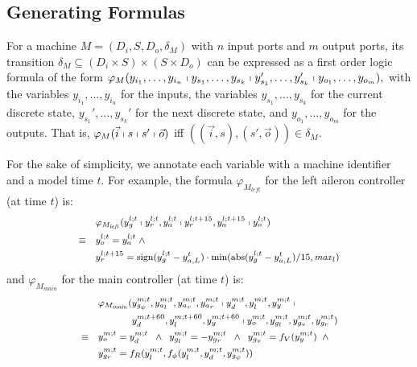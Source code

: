 \documentclass{sig-alternate}
\newcommand{\abs}{\ensuremath{\mathrm{abs}}}
\newcommand{\sign}{\ensuremath{\mathrm{sign}}}
\begin{document}
 


\subsection{Generating Formulas}

For a machine  $M = (D_i,S,D_o,\delta_M)$
with $n$ input ports and $m$ output ports,
its transition $\delta_M \subseteq (D_i \times S) \times (S \times D_o)$
can be expressed as a first order logic formula of the form
$\varphi_{M}(y_{i_1},\ldots,y_{i_n}\shortmid
y_{s_1},\ldots,y_{s_k}\shortmid
y_{s_1}',\ldots,y_{s_k}'\shortmid
y_{o_1},\ldots,y_{o_m}),
$ with
the variables $y_{i_1},\ldots,y_{i_n}$ for the inputs,
the variables $y_{s_1},\ldots,y_{s_k}$  for the current discrete state, 
$y_{s_1}',\ldots,y_{s_k}'$  for the next discrete state, and 
$y_{o_1},\ldots,y_{o_m}$  for the outputs.
That is,
$\varphi_{M}(\vec{i}\shortmid s\shortmid s'\shortmid  \vec{o})$
iff $( (\vec{i}, s), (s', \vec{o}) ) \in \delta_{M}$.

For the sake of simplicity, 
we annotate each variable with 
a machine identifier and a model time $t$. %
For example, the formula $\varphi_{M_\mathit{left}}$
for the left aileron controller (at time $t$) is:
\[
\begin{medsize}
\begin{aligned}
&
\varphi_{M_\mathit{left}}(y_{g}^{l;t} \shortmid  y_{r}^{l;t}, y_{a}^{l;t} 
	\shortmid y_{r}^{l;t + 15}, y_{a}^{l;t + 15} \shortmid y_{o}^{l;t})
\\
\equiv\quad
&
y_{o}^{l;t} = y_{a}^{l;t} \;\wedge
\\
&
y_{r}^{l;t + 15} = \sign(y_{g}^{l;t} - y_{a,L}^{t}) \cdot \min(\abs(y_{g}^{l;t} - y_{a,L}^{t}) / 15, \mathit{max}_l)
\end{aligned}
\end{medsize}
\]
and $\varphi_{M_\mathit{main}}$ for the main controller (at time $t$) is:
\[
\begin{medsize}
\begin{aligned}
&
\begin{aligned}
\varphi_{M_\mathit{main}}(
	&y_{\mathit{g}_\psi}^{m;t}, y_{a_l}^{m;t}, y_{a_v}^{m;t}, y_{a_r}^{m;t}  \shortmid
	y_d^{m;t}, y_l^{m;t}, y_y^{m;t} \shortmid
\\
	&y_d^{m;t+60}, y_l^{m;t+60}, y_y^{m;t+60} \shortmid
	y_o^{m;t}, y_{g_l}^{m;t}, y_{g_v}^{m;t}, y_{g_r}^{m;t})
\end{aligned}
\\
\equiv\quad
&
y_o^{m;t} = y_d^{m;t} 
\;\;\wedge\;\;
y_{g_l}^{m;t} = - y_{g_r}^{m;t}
\;\;\wedge\;\;
y_{g_v}^{m;t} = f_V(y_y^{m;t})
\;\;\wedge\;\;
\\
&
y_{g_r}^{m;t} = f_{R}(y_l^{m;t}, f_\phi(y_l^{m;t}, y_d^{m;t}, y_{\mathit{g}_\psi}^{m;t}))
\end{aligned}
\end{medsize}
\]
\end{document}
